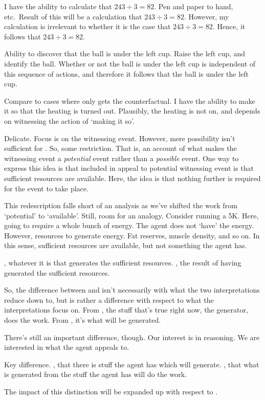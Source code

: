 \begin{note}[\WR{} def.]
  \begin{illustration}
    I have the ability to calculate that \(243 \div 3 = 82\).
    Pen and paper to hand, etc.\
    Result of this will be a calculation that \(243 \div 3 = 82\).
    However, my calculation is irrelevant to whether it is the case that \(243 \div 3 = 82\).
    Hence, it follows that \(243 \div 3 = 82\).
  \end{illustration}

  \begin{illustration}
    Ability to discover that the ball is under the left cup.
    Raise the left cup, and identify the ball.
    Whether or not the ball is under the left cup is independent of this sequence of actions, and therefore it follows that the ball is under the left cup.
  \end{illustration}

  Compare to cases where only gets the counterfactual.
  I have the ability to make it so that the heating is turned out.
  Plausibly, the heating is not on, and depends on witnessing the action of `making it so'.
\end{note}

\begin{note}
  Delicate.
  Focus is on the witnessing event.
  However, mere possibility isn't sufficient for .
  So, some restriction.
  That is, an account of what makes the witnessing event a \emph{potential} event rather than a \emph{possible} event.
  One way to express this idea is that included in appeal to potential witnessing event is that sufficient resources are available.
  Here, the idea is that nothing further is required for the event to take place.

  This redescription falls short of an analysis as we've shifted the work from `potential' to `available'.
  Still, room for an analogy.
  Consider running a 5K.
  Here, going to require a whole bunch of energy.
  The agent does not `have' the energy.
  However, resources to generate energy.
  Fat reserves, muscle density, and so on.
  In this sense, sufficient resources are available, but not something the agent has.

  \AR{}, whatever it is that generates the sufficient resources.
  \WR{}, the result of having generated the sufficient resources.

  So, the difference between \AR{} and \WR{} isn't necessarily with what the two interpretations reduce down to, but is rather a difference with respect to what the interpretations focus on.
  From \AR{}, the stuff that's true right now, the generator, does the work.
  From \WR{}, it's what will be generated.

  There's still an important difference, though.
  Our interest is in reasoning.
  We are interested in what the agent appeals to.

  Key difference.
  \AR{}, that there is stuff the agent has which will generate.
  \WR{}, that what is generated from the stuff the agent has will do the work.

  The impact of this distinction will be expanded up with respect to \gsi{}.
\end{note}



